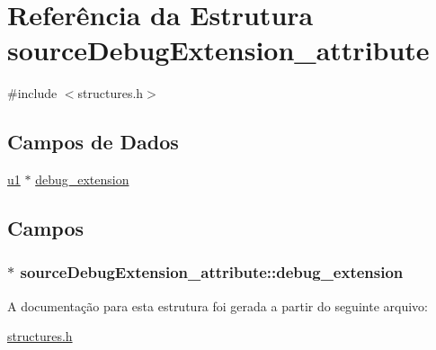 \hypertarget{structsourceDebugExtension__attribute}{}\section{Referência da Estrutura source\+Debug\+Extension\+\_\+attribute}
\label{structsourceDebugExtension__attribute}


{\ttfamily \#include $<$structures.\+h$>$}

\subsection*{Campos de Dados}
\begin{DoxyCompactItemize}
\item 
\hyperlink{lista__operandos_8h_ad9f4cdb6757615aae2fad89dab3c5470}{u1} $\ast$ \hyperlink{structsourceDebugExtension__attribute_a55b08753a7cc09bf7ca9e4b526445d7f}{debug\+\_\+extension}
\end{DoxyCompactItemize}


\subsection{Campos}
\subsubsection[{\texorpdfstring{debug\+\_\+extension}{debug_extension}}]{$\ast$ source\+Debug\+Extension\+\_\+attribute\+::debug\+\_\+extension}\hypertarget{structsourceDebugExtension__attribute_a55b08753a7cc09bf7ca9e4b526445d7f}{}\label{structsourceDebugExtension__attribute_a55b08753a7cc09bf7ca9e4b526445d7f}


A documentação para esta estrutura foi gerada a partir do seguinte arquivo\+:\begin{DoxyCompactItemize}
\item 
\hyperlink{structures_8h}{structures.\+h}\end{DoxyCompactItemize}
